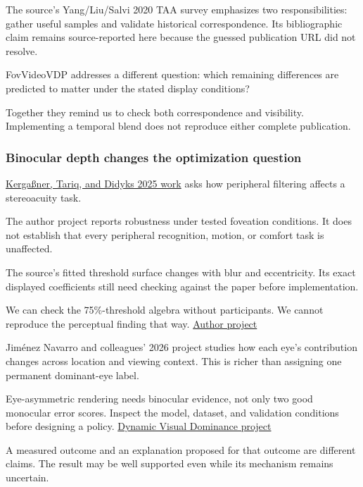 The source's Yang/Liu/Salvi 2020 TAA survey emphasizes two responsibilities: gather useful samples and validate historical correspondence. Its bibliographic claim remains source-reported here because the guessed publication URL did not resolve.

FovVideoVDP addresses a different question: which remaining differences are predicted to matter under the stated display conditions?

Together they remind us to check both correspondence and visibility. Implementing a temporal blend does not reproduce either complete publication.

\subsubsection{Binocular depth changes the optimization question}\label{04-visual-computing-ii-ch042-binocular-depth-changes-the-optimization-question}

\hypertarget{04-visual-computing-ii-ch042-binocular-depth-changes-the-optimization-question}{}

\hyperref[appendix-8dc848f14052]{Kergaßner, Tariq, and Didyk\textquotesingle s 2025 work} asks how peripheral filtering affects a stereoacuity task.

The author project reports robustness under tested foveation conditions. It does not establish that every peripheral recognition, motion, or comfort task is unaffected.

The source's fitted threshold surface changes with blur and eccentricity. Its exact displayed coefficients still need checking against the paper before implementation.

We can check the 75\%-threshold algebra without participants. We cannot reproduce the perceptual finding that way. \href{https://sophie-kergassner.github.io/depth-in-periphery.html}{Author project}

Jiménez Navarro and colleagues' 2026 project studies how each eye's contribution changes across location and viewing context. This is richer than assigning one permanent dominant-eye label.

Eye-asymmetric rendering needs binocular evidence, not only two good monocular error scores. Inspect the model, dataset, and validation conditions before designing a policy. \href{https://dynamicvisualdominance.mpi-inf.mpg.de/}{Dynamic Visual Dominance project}

A measured outcome and an explanation proposed for that outcome are different claims. The result may be well supported even while its mechanism remains uncertain.

